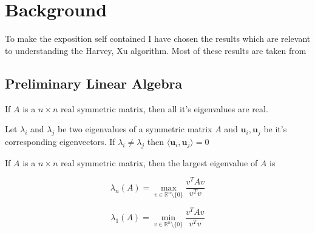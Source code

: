 
\chapter{Background} %

\label{Chapter2} %

% 
% 

To make the exposition self contained I have chosen the results which are relevant to understanding the Harvey, Xu algorithm. Most of these results are taken from \citet{TCS-054}

\section{Preliminary Linear Algebra}

\begin{Bf}
 If $A$ is a $n \times n$ real symmetric matrix, then all it's eigenvalues are real. 
\end{Bf}

\begin{Bf}
 Let $\lambda_i$ and $\lambda_j$ be two eigenvalues of a symmetric matrix $A$ and $\textbf{u}_i, \textbf{u}_j$ be it's corresponding eigenvectors. If $\lambda_i \neq \lambda_j$ then $\langle \textbf{u}_i, \textbf{u}_j \rangle = 0$
\end{Bf}

\begin{Bf}
 If $A$ is a $n \times n$ real symmetric matrix, then the largest eigenvalue of $A$ is 
 
 $$ \lambda_n(A) = \max_{v \in \mathbb{R}^n \setminus \{0\}} \frac{v^T A v}{v^Tv}$$
 
 $$ \lambda_1(A) = \min_{v \in \mathbb{R}^n \setminus \{0\}} \frac{v^T A v}{v^Tv}$$
\end{Bf}

